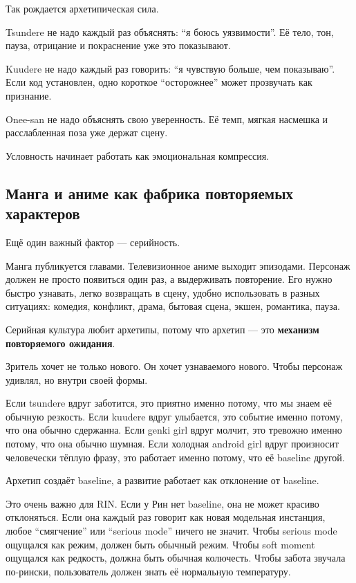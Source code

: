 Так рождается архетипическая сила.

Tsundere не надо каждый раз объяснять: ``я боюсь уязвимости''. Её тело,
тон, пауза, отрицание и покраснение уже это показывают.

Kuudere не надо каждый раз говорить: ``я чувствую больше, чем
показываю''. Если код установлен, одно короткое ``осторожнее'' может
прозвучать как признание.

Onee-san не надо объяснять свою уверенность. Её темп, мягкая насмешка и
расслабленная поза уже держат сцену.

Условность начинает работать как эмоциональная компрессия.

\subsection*{Манга и аниме как фабрика повторяемых характеров}

Ещё один важный фактор --- серийность.

Манга публикуется главами. Телевизионное аниме выходит эпизодами.
Персонаж должен не просто появиться один раз, а выдерживать повторение.
Его нужно быстро узнавать, легко возвращать в сцену, удобно использовать
в разных ситуациях: комедия, конфликт, драма, бытовая сцена, экшен,
романтика, пауза.

Серийная культура любит архетипы, потому что архетип --- это
\textbf{механизм повторяемого ожидания}.

Зритель хочет не только нового. Он хочет узнаваемого нового. Чтобы
персонаж удивлял, но внутри своей формы.

Если tsundere вдруг заботится, это приятно именно потому, что мы знаем
её обычную резкость. Если kuudere вдруг улыбается, это событие именно
потому, что она обычно сдержанна. Если genki girl вдруг молчит, это
тревожно именно потому, что она обычно шумная. Если холодная android
girl вдруг произносит человечески тёплую фразу, это работает именно
потому, что её baseline другой.

Архетип создаёт baseline, а развитие работает как отклонение от
baseline.

Это очень важно для RIN. Если у Рин нет baseline, она не может красиво
отклоняться. Если она каждый раз говорит как новая модельная инстанция,
любое ``смягчение'' или ``serious mode'' ничего не значит. Чтобы serious
mode ощущался как режим, должен быть обычный режим. Чтобы soft moment
ощущался как редкость, должна быть обычная колючесть. Чтобы забота
звучала по-рински, пользователь должен знать её нормальную температуру.

